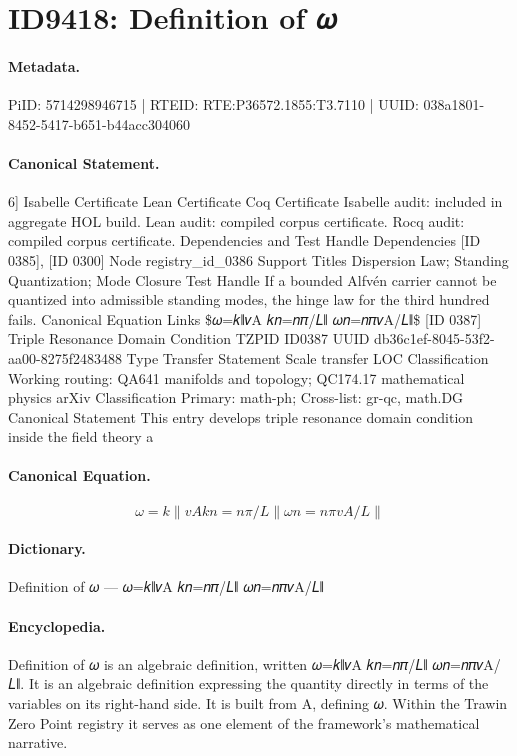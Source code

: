\section*{ID9418: Definition of 𝜔}
\paragraph{Metadata.}
PiID: 5714298946715 | RTEID: RTE:P36572.1855:T3.7110 | UUID: 038a1801-8452-5417-b651-b44acc304060

\paragraph{Canonical Statement.}
6] Isabelle Certificate Lean Certificate Coq Certificate Isabelle audit: included in aggregate HOL build. Lean audit: compiled corpus certificate. Rocq audit: compiled corpus certificate. Dependencies and Test Handle Dependencies [ID 0385], [ID 0300] Node registry\_id\_0386 Support Titles Dispersion Law; Standing Quantization; Mode Closure Test Handle If a bounded Alfvén carrier cannot be quantized into admissible standing modes, the hinge law for the third hundred fails. Canonical Equation Links \$𝜔=𝑘∥𝑣A 𝑘𝑛=𝑛𝜋/𝐿∥ 𝜔𝑛=𝑛𝜋𝑣A/𝐿∥\$ [ID 0387] Triple Resonance Domain Condition TZPID ID0387 UUID db36c1ef-8045-53f2-aa00-8275f2483488 Type Transfer Statement Scale transfer LOC Classification Working routing: QA641 manifolds and topology; QC174.17 mathematical physics arXiv Classification Primary: math-ph; Cross-list: gr-qc, math.DG Canonical Statement This entry develops triple resonance domain condition inside the field theory a

\paragraph{Canonical Equation.}
\[
𝜔=𝑘∥𝑣A 𝑘𝑛=𝑛𝜋/𝐿∥ 𝜔𝑛=𝑛𝜋𝑣A/𝐿∥
\]

\paragraph{Dictionary.}
Definition of 𝜔 — 𝜔=𝑘∥𝑣A 𝑘𝑛=𝑛𝜋/𝐿∥ 𝜔𝑛=𝑛𝜋𝑣A/𝐿∥

\paragraph{Encyclopedia.}
Definition of 𝜔 is an algebraic definition, written 𝜔=𝑘∥𝑣A 𝑘𝑛=𝑛𝜋/𝐿∥ 𝜔𝑛=𝑛𝜋𝑣A/𝐿∥. It is an algebraic definition expressing the quantity directly in terms of the variables on its right-hand side. It is built from A, defining 𝜔. Within the Trawin Zero Point registry it serves as one element of the framework's mathematical narrative.
